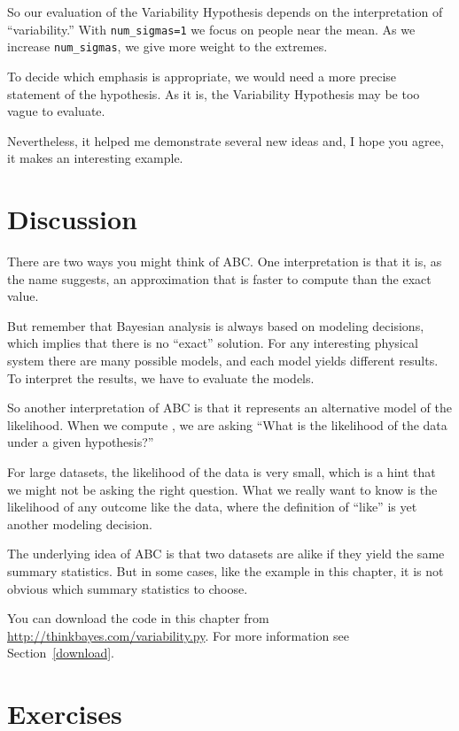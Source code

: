 \documentclass[12pt]{book}
\begin{document}
So our evaluation of the Variability Hypothesis depends on the
interpretation of ``variability.''  With \verb"num_sigmas=1" we
focus on people near the mean.  As we increase
\verb"num_sigmas", we give more weight to the extremes.  

To decide which
emphasis is appropriate, we would need a more precise statement
of the hypothesis.  As it is, the Variability Hypothesis may be
too vague to evaluate.

Nevertheless, it helped
me demonstrate several new ideas and, I hope you agree,
it makes an interesting example.


\section{Discussion}

There are two ways you might think of ABC.  One interpretation
is that it is, as the name suggests, an approximation that is
faster to compute than the exact value.

But remember that Bayesian analysis is always
based on modeling decisions, which implies that there is no
``exact'' solution.  For any interesting
physical system there are many possible models, and each model
yields different results.  To interpret the results, we have to
evaluate the models.

So another interpretation of ABC is that it represents an alternative
model of the likelihood.  When we compute , we are asking
``What is the likelihood of the data under a given hypothesis?''

For large datasets, the likelihood of the data is very small, which
is a hint that we might not be asking the right question.  What
we really want to know is the likelihood of any outcome
like the data, where the definition of ``like'' is yet another
modeling decision.

The underlying idea of ABC is that two datasets are alike if they yield
the same summary statistics.  But in some cases, like the example in
this chapter, it is not obvious which summary statistics to choose.

You can download the code in this chapter from
\url{http://thinkbayes.com/variability.py}.
  For more information
see Section~\ref{download}.

\section{Exercises}
\end{document}
